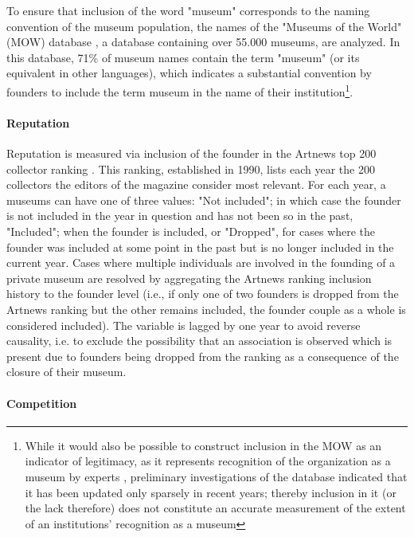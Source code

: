 \documentclass[12pt]{article}
\begin{document}
To ensure that inclusion of the word "museum" corresponds to the naming convention of the museum population, the names of the "Museums of the World" (MOW) database \parencite{deGruyter_2021_MOW}, a database containing over 55.000 museums, are analyzed.
In this database, 71\% of museum names contain the term "museum" (or its equivalent in other languages), which indicates a substantial convention by founders to include the term museum in the name of their institution\footnote{While it would also be possible to construct inclusion in the MOW as an indicator of legitimacy, as it represents recognition of the organization as a museum by experts \parencite{Zuckerman_1999_illegitimacy}, preliminary investigations of the database indicated that it has been  updated only sparsely in recent years; thereby inclusion in it (or the lack therefore) does not constitute an accurate measurement of the extent of an institutions' recognition as a museum}.
\paragraph*{Reputation}


Reputation is measured via inclusion of the founder in the Artnews top 200 collector ranking \parencite{Artnews_ranking}.
This ranking, established in 1990, lists each year the 200 collectors the editors of the magazine consider most relevant.
For each year, a museums can have one of three values: "Not included"; in which case the founder is not included in the year in question and has not been so in the past, "Included"; when the founder is included, or "Dropped", for cases where the founder was included at some point in the past but is no longer included in the current year.
Cases where multiple individuals are involved in the founding of a private museum are resolved by aggregating the Artnews ranking inclusion history to the founder level (i.e., if only one of two founders is dropped from the Artnews ranking but the other remains included, the founder couple as a whole is considered included).
The variable is lagged by one year to avoid reverse causality, i.e. to exclude the possibility that an association is observed which is present due to founders being dropped from the ranking as a consequence of the closure of their museum.
\paragraph*{Competition}
\end{document}
